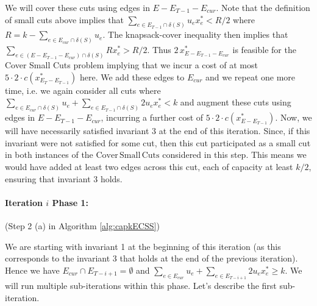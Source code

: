 \documentclass[11pt]{article}
\newcommand\ASC{\mathrm{Cover\,Small\,Cuts}}
\newcommand{\alphatwo}{2}
\begin{document}
{We will cover these cuts using edges in $E-E_{T-1} - E_{cur}$. Note
that the definition of small cuts above implies that $\sum_{e\in
E_{T-1} \cap \delta(S)}u_ex^*_e < R/\alphatwo$ where $R = k - \sum_{e\in E_{cur} \cap \delta(S)}u_e$.
The knapsack-cover inequality then implies that $\sum_{e\in (E-E_{T-1} - E_{cur}) \cap \delta(S)}
R x^*_e > R/\alphatwo$. Thus $\alphatwo\,x^*_{E-E_{T-1}
- E_{cur}}$ is feasible for the Cover Small Cuts problem implying
that we incur a cost of at most $5 \cdot \alphatwo \cdot c(x^*_{E_T-E_{T-1}})$
here. We add these edges to $E_{cur}$ and we repeat one more time,
i.e. we again consider all cuts where $\sum_{e\in E_{cur} \cap \delta(S)}u_e+
\sum_{e\in E_{T-1} \cap \delta(S)}\alphatwo u_ex^*_e < k$ and augment these cuts using
edges in $E-E_{T-1} - E_{cur}$, incurring a further cost of
$5 \cdot \alphatwo \cdot c(x^*_{E-E_{T-1}})$. Now, we will have necessarily satisfied
invariant 3 at the end of this iteration. Since, if this invariant were not satisfied for some cut, then this cut 
participated as a small cut in both instances of the $\ASC$ considered in this step.
This means we would have added at least two edges across this cut, each of capacity at least $k/2$, ensuring that invariant 3 holds.


\paragraph{Iteration $i$ Phase 1:} (Step 2 (a) in Algorithm \ref{alg:capkECSS})

We are starting with invariant 1 at the beginning of this iteration
(as this corresponds to the invariant 3 that holds at the end of the previous iteration). Hence we
have $E_{cur} \cap E_{T-i+1} = \emptyset$ and $\sum_{e\in E_{cur}}u_e
+ \sum_{e\in E_{T-i + 1}} \alphatwo u_ex^*_e \geq k$. We will run
multiple sub-iterations within this phase. Let's describe the first
sub-iteration.

}
\end{document}

